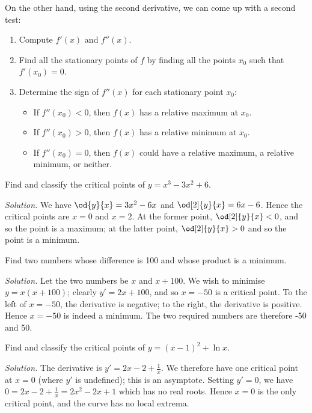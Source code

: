 On the other hand, using the second derivative, we can come up with a second test:
\begin{enumerate}
  \item Compute $ f'(x) $ and $ f''(x) $.
  \item Find all the stationary points of $ f $ by finding all the points $ x_0 $ such that $ f'(x_0) = 0 $.
  \item Determine the sign of $ f''(x) $ for each stationary point $ x_0 $:
    \begin{itemize}
      \item If $ f''(x_0) < 0 $, then $ f(x) $ has a relative maximum at $ x_0 $.
      \item If $ f''(x_0) > 0 $, then $ f(x) $ has a relative minimum at $ x_0 $.
      \item If $ f''(x_0) = 0 $, then $ f(x) $ could have a relative maximum, a relative minimum, or neither.
    \end{itemize}
\end{enumerate}

\begin{ex}
  Find and classify the critical points of $ y = x^3 - 3x^2 + 6 $.

  \textit{Solution.} We have $ \od{y}{x} = 3x^2 - 6x $ and $ \od[2]{y}{x} = 6x - 6 $. Hence
                     the critical points are $ x = 0 $ and $ x = 2 $. At the former point, $ \od[2]{y}{x} < 0 $,
                     and so the point is a maximum; at the latter point, $ \od[2]{y}{x} > 0 $ and so the point is
                     a minimum.
\end{ex}

\begin{ex}
  Find two numbers whose difference is 100 and whose product is a minimum.

  \textit{Solution.} Let the two numbers be $ x $ and $ x + 100 $. We wish to minimise $ y = x(x + 100) $;
  clearly $ y' = 2x + 100 $, and so $ x = -50 $ is a critical point. To the left of $ x = -50 $, the derivative
  is negative; to the right, the derivative is positive. Hence $ x = -50 $ is indeed a minimum. The two required
  numbers are therefore -50 and 50.
\end{ex}

\begin{ex}
  Find and classify the critical points of $ y = (x - 1)^2 + \ln x $.

  \textit{Solution.} The derivative is $ y' = 2x - 2 + \frac{1}{x} $. We therefore have one critical
  point at $ x = 0 $ (where $ y' $ is undefined); this is an asymptote.
  Setting $ y' = 0 $, we have $ 0 = 2x - 2 + \frac{1}{x} = 2x^2 - 2x + 1 $ which has no real roots. Hence $ x = 0 $ is
  the only critical point, and the curve has no local extrema.
\end{ex}

